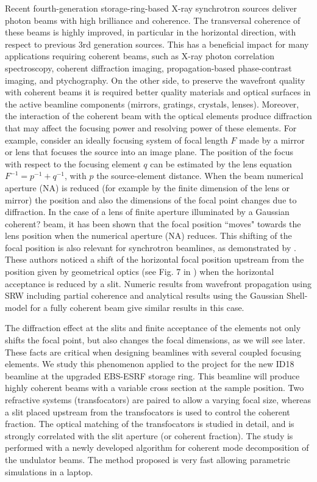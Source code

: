 \documentclass{iucr}              %
\newcommand{\inred}[1]{{\color{red}#1}}
\begin{document}
Recent fourth-generation storage-ring-based X-ray synchrotron sources deliver photon beams with high brilliance and coherence. The transversal coherence of these beams is highly improved, in particular in the horizontal direction, with respect to previous 3rd generation sources. This has a beneficial impact for many applications requiring coherent beams, such as X-ray photon correlation spectroscopy, coherent diffraction imaging, propagation-based phase-contrast imaging, and ptychography. On the other side, to preserve the wavefront quality with coherent beams it is required better quality materials and optical surfaces in the active beamline components (mirrors, gratings, crystals, lenses). Moreover, the interaction of the coherent beam with the optical elements produce diffraction that may affect the focusing power and resolving power of these elements. For example, consider an ideally focusing system of focal length $F$ made by a mirror or lens that focuses the source into an image plane. The position of the focus with respect to the focusing element $q$ can be estimated by the lens equation $F^{-1}=p^{-1}+q^{-1}$, with $p$ the source-element distance. When the beam numerical aperture (NA) is reduced (for example by the finite dimension of the lens or mirror) the position and also the dimensions of the focal point changes due to diffraction. In the case of a lens of finite aperture illuminated by a Gaussian \inred{coherent?} beam, it has been shown \cite{Tanaka:85} that the focal position ``moves" towards the lens position when the numerical aperture (NA) reduces. This shifting of the focal position is also relevant for synchrotron beamlines, as demonstrated by \cite{westfahl}. These authors noticed a shift of the horizontal focal position upstream from the position given by geometrical optics (see Fig. 7 in \cite{westfahl}) when the horizontal acceptance is reduced by a slit. Numeric results from wavefront propagation using SRW \cite{SRW} including partial coherence and analytical results using the Gaussian Shell-model for a fully coherent beam give similar results in this case.

The diffraction effect at the slits and finite acceptance of the elements not only shifts the focal point, but also changes the focal dimensions, as we will see later. These facts are critical when designing beamlines with several coupled focusing elements. We study this phenomenon applied to the project for the new ID18 beamline at the upgraded EBS-ESRF storage ring. This beamline will produce highly coherent beams with a variable cross section at the sample position. Two refractive systems (transfocators) are paired to allow a varying focal size, whereas a slit placed upstream from the transfocators is used to control the coherent fraction. The optical matching of the transfocators is studied in detail, and is strongly correlated with the slit aperture (or coherent fraction). The study is performed with a newly developed algorithm for coherent mode decomposition of the undulator beams. The method proposed is very fast allowing parametric simulations in a laptop.
\end{document}
